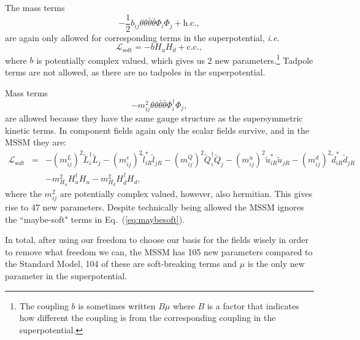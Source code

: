 \documentclass[notes.tex]{subfiles}
\begin{document}
The mass terms
\[-\frac{1}{2}b_{ij}\theta\theta\bar{\theta}\bar{\theta}\Phi_i \Phi_j+\text{h.c.},\]
are again only allowed for corresponding terms in the superpotential, {\it i.e.}\ 
\[ \mathcal L_\text{soft} = -bH_uH_d + \text{c.c.},\]
where $b$ is potentially complex valued, which gives us 2 new parameters.\footnote{The coupling $b$ is sometimes written $B\mu$ where $B$ is a factor that indicates how different the coupling is from the corresponding coupling in the superpotential.} Tadpole terms are not allowed, as there are no tadpoles in the superpotential. 

Mass terms
\[-m_{ij}^2\theta\theta\bar{\theta}\bar{\theta}\Phi^\dagger_i \Phi_j,\]
are allowed because they have the same gauge structure as the supersymmetric kinetic terms. In component fields again only the scalar fields survive, and in the MSSM they are:
\begin{eqnarray}
\mathcal L_\text{soft} &=& -(m^L_{ij})^2\tilde{L}_i^\dagger\tilde{L}_j -(m^e_{ij})^2\tilde{l}_{iR}^*\tilde{l}_{jR} - (m_{ij}^Q)^2\tilde{Q}_i^\dagger \tilde{Q}_j - (m^u_{ij})^2\tilde{u}^*_{iR}\tilde{u}_{jR} - (m_{ij}^d)^2\tilde{d}^*_{iR}\tilde{d}_{jR}\nonumber\\
&& - m_{H_u}^2H_u^\dagger H_u - m_{H_d}^2 H_d^\dagger H_d,
\label{eq:MSSM_soft_kin}
\end{eqnarray}
where the $m_{ij}^2$ are potentially complex valued, however, also hermitian. This gives rise to 47 new parameters. Despite technically being allowed the MSSM ignores the ``maybe-soft" terms in Eq.~(\ref{eq:maybesoft}).

In total, after using our freedom to choose our basis for the fields wisely in order to remove what freedom we can, the MSSM has 105 new parameters compared to the Standard Model, 104 of these are soft-breaking terms and $\mu$ is the only new parameter in the superpotential.



\end{document}
